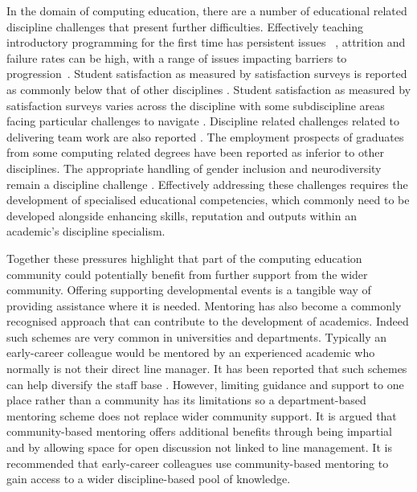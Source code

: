 \documentclass[sigconf]{acmart}
\begin{document}
In the domain of computing education, there are a number of educational related discipline challenges that present further difficulties. Effectively teaching introductory programming for the first time has persistent issues ~\cite{davenport-et-al:latice2016,murphy-et-al:programming2017,simon-et-al:sigcse2018}, attrition and failure rates can be high, with a range of issues impacting barriers to progression~\cite{Watson:2014:FRI:2591708.2591749}. Student satisfaction as measured by satisfaction surveys is reported as commonly below that of other disciplines \cite{Sinclair2015}. Student satisfaction as measured by satisfaction surveys varies across the discipline with some subdiscipline areas facing particular challenges to navigate \cite{Knutas2021}. Discipline related challenges related to delivering team work are also reported \cite{Gordon2010,Crick2020CEP}. The employment prospects of graduates from some computing related degrees have been reported as inferior to other disciplines\cite{shadbolt2016shadbolt}. The appropriate handling of gender inclusion and neurodiversity remain a discipline challenge \cite{Winter2021, Stuurman2109}. Effectively addressing these challenges requires the development of specialised educational competencies, which commonly need to be developed alongside enhancing skills, reputation and outputs within an academic’s discipline specialism. 

Together these pressures highlight that part of the computing education community could potentially benefit from further support from the wider community. Offering supporting developmental events is a tangible way of providing assistance where it is needed. Mentoring has also become a commonly recognised approach that can contribute to the development of academics. Indeed such schemes are very common in universities and departments. Typically an early-career colleague would be mentored by an experienced academic who normally is not their direct line manager. It has been reported that such schemes can help diversify the staff base \cite{Golubchik2018}. However, limiting guidance and support to one place rather than a community has its limitations \cite{Golubchik2018} so a department-based mentoring scheme does not replace wider community support.  It is argued that community-based mentoring offers additional benefits through being impartial and by allowing space for open discussion not linked to line management. It is recommended that early-career colleagues use community-based mentoring to gain access to a wider discipline-based pool of knowledge. 
\end{document}
